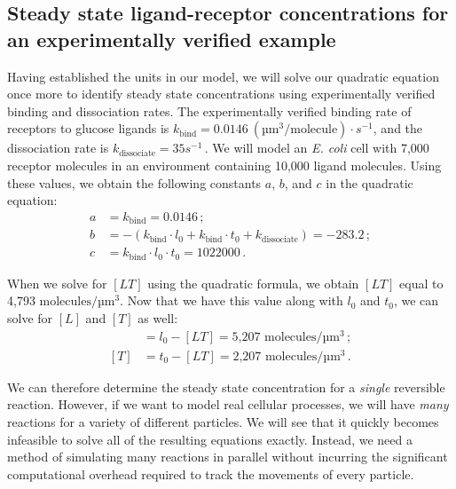 \fudgespace

\begin{qbox}\end{qbox}

\FloatBarrier
{}
\subsection{Steady state ligand-receptor concentrations for an experimentally verified example}

Having established the units in our model, we will solve our quadratic equation once more to identify steady state concentrations using experimentally verified binding and dissociation rates. The experimentally verified binding rate of receptors to glucose ligands is $k_\text{bind} = 0.0146~(\text{µm}^3/\text{molecule}) \cdot s^{-1}$, and the dissociation rate is $k_\text{dissociate} = 35s^{-1}$\,. We will model an \textit{E. coli} cell with 7,000 receptor molecules in an environment containing 10,000 ligand molecules. Using these values, we obtain the following constants $a$, $b$, and $c$ in the quadratic equation:
\begin{align*}
a & = k_\text{bind} = 0.0146\,;\\
b & = - (k_\text{bind} \cdot l_0 + k_\text{bind} \cdot t_0 + k_\text{dissociate}) = -283.2\,;\\
c & = k_\text{bind} \cdot l_0 \cdot t_0 = 1022000\,.
\end{align*}

When we solve for $[LT]$ using the quadratic formula, we obtain $[LT]$ equal to 4,793 $\text{molecules}/\text{µm}^3$. Now that we have this value along with $l_0$ and $t_0$, we can solve for $[L]$ and $[T]$ as well:
\begin{align*}
[L] & = l_0 - [LT] = \text{5,207 molecules}/\text{µm}^3\,;\\
[T] & = t_0 - [LT] = \text{2,207 molecules}/\text{µm}^3\,.
\end{align*}

We can therefore determine the steady state concentration for a \textit{single} reversible reaction. However, if we want to model real cellular processes, we will have \textit{many} reactions for a variety of different particles. We will see that it quickly becomes infeasible to solve all of the resulting equations exactly. Instead, we need a method of simulating many reactions in parallel without incurring the significant computational overhead required to track the movements of every particle.\\

